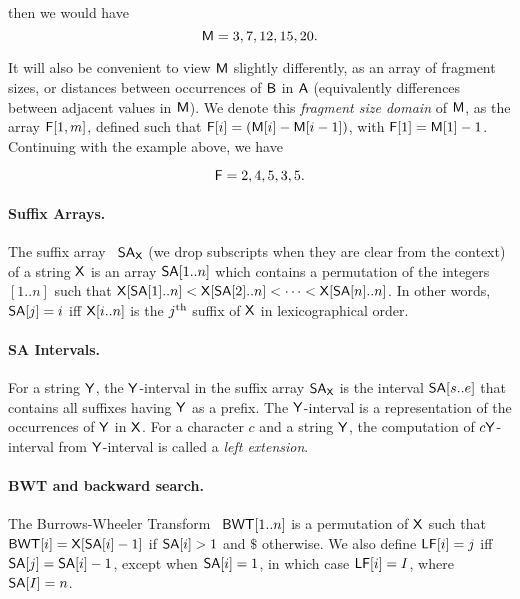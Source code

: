 then we would have 
$$\mbox{\rm {\sf M}} = 3,7,12,15,20.$$

It will also be convenient to view $\mbox{\rm {\sf M}}$ slightly differently, as an array of fragment 
sizes, or distances between occurrences of $\mathsf{B}$ in $\mathsf{A}$ (equivalently differences
between adjacent values in $\mbox{\rm {\sf M}}$). We denote this {\em fragment size domain} of $\mbox{\rm {\sf M}}$, 
as the array $\mbox{\rm {\sf F}}[1,m]$, defined such that $\mbox{\rm {\sf F}}[i] = (\mbox{\rm {\sf M}}[i]-\mbox{\rm {\sf M}}[i-1])$, with $\mbox{\rm {\sf F}}[1] = \mbox{\rm {\sf M}}[1]-1$.  
Continuing with the example above, we have

$$\mbox{\rm {\sf F}} = 2,4,5,3,5.$$


\paragraph{Suffix Arrays.}
The suffix array~\cite{mm1993} $\mbox{\rm {\sf SA}}_{\mathsf{X}}$ (we drop subscripts when
they are clear
from the context) of a string $\mathsf{X}$
is an array $\mbox{\rm {\sf SA}}[1..n]$ which
contains a permutation of the integers $[1..n]$ such that $\mathsf{X}[\mbox{\rm {\sf SA}}[1]..n]
< \mathsf{X}[\mbox{\rm {\sf SA}}[2]..n] < \cdots < \mathsf{X}[\mbox{\rm {\sf SA}}[n]..n]$.  In other words, $\mbox{\rm {\sf SA}}[j] =
i$ iff $\mathsf{X}[i..n]$ is the $j^{\mbox{{\scriptsize th}}}$ suffix of $\mathsf{X}$
in lexicographical order.

\paragraph{SA Intervals.} 
For a string $\mathsf{Y}$, the $\mathsf{Y}$-interval in the suffix array $\mbox{\rm {\sf SA}}_{\mathsf{X}}$ is
the interval $\mbox{\rm {\sf SA}}[s..e]$ that contains all suffixes having $\mathsf{Y}$ as a
prefix. The $\mathsf{Y}$-interval is a representation of the occurrences of
$\mathsf{Y}$ in $\mathsf{X}$. For a character $c$ and a string $\mathsf{Y}$, the computation
of $c\mathsf{Y}$-interval from $\mathsf{Y}$-interval is called a \emph{left extension}.

\paragraph{BWT and backward search.}
The Burrows-Wheeler Transform~\cite{bw1994} $\mbox{\rm {\sf BWT}}[1..n]$ is a
permutation of $\mathsf{X}$ such that $\mbox{\rm {\sf BWT}}[i] = \mathsf{X}[\mbox{\rm {\sf SA}}[i]-1]$ if $\mbox{\rm {\sf SA}}[i]>1$
and $\$$ otherwise. We also define $\mbox{\rm {\sf LF}}[i] = j$ iff $\mbox{\rm {\sf SA}}[j] =
\mbox{\rm {\sf SA}}[i]-1$, except when $\mbox{\rm {\sf SA}}[i] = 1$, in which case $\mbox{\rm {\sf LF}}[i] = I$,
where $\mbox{\rm {\sf SA}}[I] = n$.

